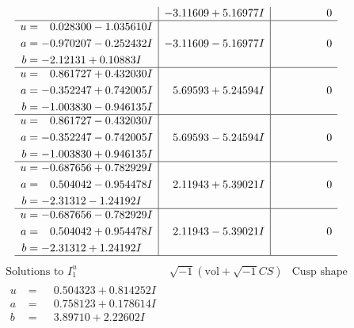 \documentclass[1p]{elsarticle_modified}
\theoremstyle{definition}
\newcommand{\I}{\sqrt{-1}}
\begin{document}
$$\begin{array}{c|c|c}
 & -3.11609 + 5.16977 I & \phantom{-0.000000 } 0 \\ \hline\begin{aligned}
u &= \phantom{-}0.028300 - 1.035610 I \\
a &= -0.970207 - 0.252432 I \\
b &= -2.12131 + 0.10883 I\end{aligned}
 & -3.11609 - 5.16977 I & \phantom{-0.000000 } 0 \\ \hline\begin{aligned}
u &= \phantom{-}0.861727 + 0.432030 I \\
a &= -0.352247 + 0.742005 I \\
b &= -1.003830 - 0.946135 I\end{aligned}
 & \phantom{-}5.69593 + 5.24594 I & \phantom{-0.000000 } 0 \\ \hline\begin{aligned}
u &= \phantom{-}0.861727 - 0.432030 I \\
a &= -0.352247 - 0.742005 I \\
b &= -1.003830 + 0.946135 I\end{aligned}
 & \phantom{-}5.69593 - 5.24594 I & \phantom{-0.000000 } 0 \\ \hline\begin{aligned}
u &= -0.687656 + 0.782929 I \\
a &= \phantom{-}0.504042 - 0.954478 I \\
b &= -2.31312 - 1.24192 I\end{aligned}
 & \phantom{-}2.11943 + 5.39021 I & \phantom{-0.000000 } 0 \\ \hline\begin{aligned}
u &= -0.687656 - 0.782929 I \\
a &= \phantom{-}0.504042 + 0.954478 I \\
b &= -2.31312 + 1.24192 I\end{aligned}
 & \phantom{-}2.11943 - 5.39021 I & \phantom{-0.000000 } 0\\
 \hline 
 \end{array}$$\newpage$$\begin{array}{c|c|c}  
\text{Solutions to }I^u_{1}& \I (\text{vol} + \sqrt{-1}CS) & \text{Cusp shape}\\
 \hline 
\begin{aligned}
u &= \phantom{-}0.504323 + 0.814252 I \\
a &= \phantom{-}0.758123 + 0.178614 I \\
b &= \phantom{-}3.89710 + 2.22602 I\end{aligned}

\end{array}$$
\end{document}
